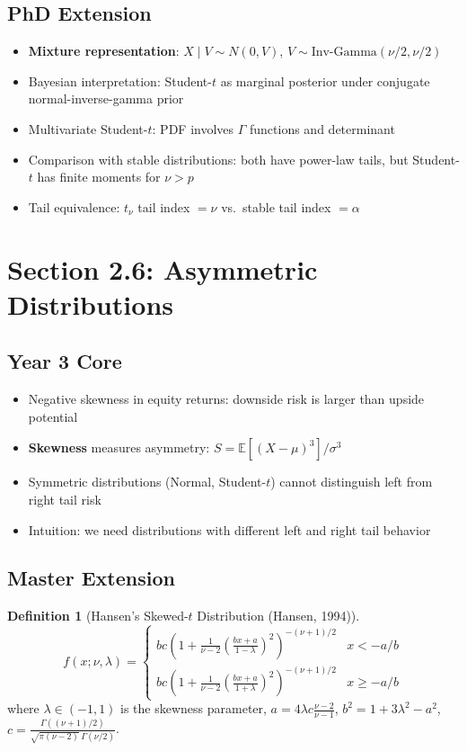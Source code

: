 \documentclass[11pt, a4paper]{article}
\newcommand{\E}{\mathbb{E}}
\theoremstyle{definition}
\newtheorem{defn}{Definition}
\begin{document}
\subsection{PhD Extension}
\begin{itemize}
  \item \textbf{Mixture representation}: $X \mid V \sim N(0, V)$, $V \sim \text{Inv-Gamma}(\nu/2, \nu/2)$
  \item Bayesian interpretation: Student-$t$ as marginal posterior under conjugate normal-inverse-gamma prior
  \item Multivariate Student-$t$: PDF involves $\Gamma$ functions and determinant
  \item Comparison with stable distributions: both have power-law tails, but Student-$t$ has finite moments for $\nu > p$
  \item Tail equivalence: $t_\nu$ tail index $= \nu$ vs.\ stable tail index $= \alpha$
\end{itemize}

\section{Section 2.6: Asymmetric Distributions}

\subsection{Year 3 Core}
\begin{itemize}
  \item Negative skewness in equity returns: downside risk is larger than upside potential
  \item \textbf{Skewness} measures asymmetry: $S = \E[(X-\mu)^3] / \sigma^3$
  \item Symmetric distributions (Normal, Student-$t$) cannot distinguish left from right tail risk
  \item Intuition: we need distributions with different left and right tail behavior
\end{itemize}

\subsection{Master Extension}

\begin{defn}[Hansen's Skewed-$t$ Distribution (Hansen, 1994)]
\[
  f(x;\nu,\lambda) = \begin{cases}
    bc\!\left(1 + \frac{1}{\nu-2}\left(\frac{bx+a}{1-\lambda}\right)^{\!2}\right)^{-(\nu+1)/2} & x < -a/b \\[6pt]
    bc\!\left(1 + \frac{1}{\nu-2}\left(\frac{bx+a}{1+\lambda}\right)^{\!2}\right)^{-(\nu+1)/2} & x \geq -a/b
  \end{cases}
\]
where $\lambda \in (-1,1)$ is the skewness parameter, $a = 4\lambda c\frac{\nu-2}{\nu-1}$, $b^2 = 1 + 3\lambda^2 - a^2$, $c = \frac{\Gamma((\nu+1)/2)}{\sqrt{\pi(\nu-2)}\,\Gamma(\nu/2)}$.
\end{defn}
\end{document}
